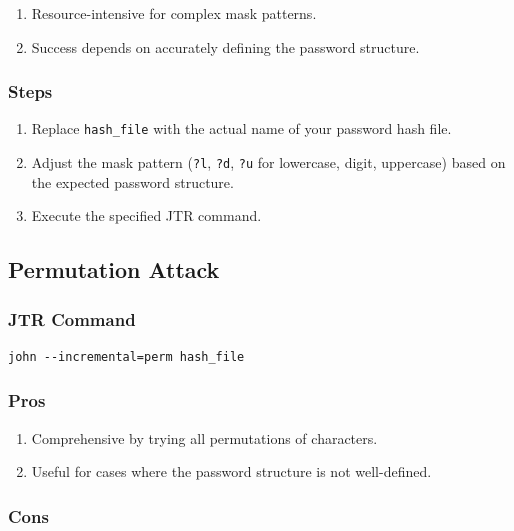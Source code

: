 \documentclass[11pt]{article}
\begin{document}
\begin{enumerate}
    \item Resource-intensive for complex mask patterns.
    \item Success depends on accurately defining the password structure.
\end{enumerate}

\subsubsection{Steps}

\begin{enumerate}
    \item Replace \texttt{hash\_file} with the actual name of your password hash file.
    \item Adjust the mask pattern (\texttt{?l}, \texttt{?d}, \texttt{?u} for lowercase, digit, uppercase) based on the expected password structure.
    \item Execute the specified JTR command.
\end{enumerate}



\subsection{Permutation Attack}

\subsubsection{JTR Command}

\begin{verbatim}
john --incremental=perm hash_file
\end{verbatim}

\subsubsection{Pros}

\begin{enumerate}
    \item Comprehensive by trying all permutations of characters.
    \item Useful for cases where the password structure is not well-defined.
\end{enumerate}

\subsubsection{Cons}
\end{document}
